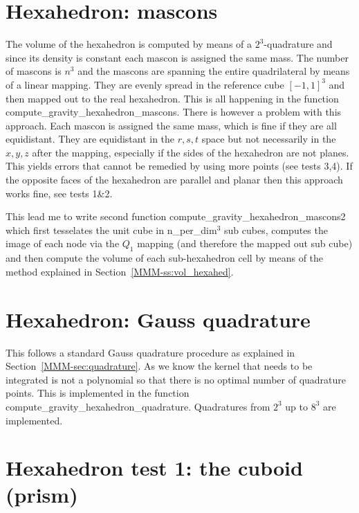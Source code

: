 \section*{Hexahedron: mascons}

The volume of the hexahedron is computed by means of a $2^3$-quadrature and since its density is 
constant each mascon is assigned the same mass. 
The number of mascons is $n^3$ and the mascons are spanning the entire 
quadrilateral by means of a linear mapping. They are evenly spread in the 
reference cube $[-1,1]^3$ and then mapped out to the real hexahedron.
This is all happening in the function {\python compute\_gravity\_hexahedron\_mascons}.
There is however a problem with this approach. Each mascon is assigned the same mass, 
which is fine if they are all equidistant. They are equidistant in the $r,s,t$ space
but not necessarily in the $x,y,z$ after the mapping, especially if the sides of the 
hexahedron are not planes. This yields errors that cannot be remedied by using 
more points (see tests 3,4). If the opposite faces of the hexahedron are  
parallel and planar then this approach works fine, see tests 1\&2.

This lead me to write second function {\python compute\_gravity\_hexahedron\_mascons2}
which first tesselates the unit cube in {\python n\_per\_dim}$^3$ sub cubes, 
computes the image of each node via the $Q_1$ mapping (and therefore the mapped out
sub cube) and then compute the volume of each sub-hexahedron cell by means of the method explained in 
Section~\ref{MMM-ss:vol_hexahed}.

\section*{Hexahedron: Gauss quadrature}

This follows a standard Gauss quadrature procedure as explained
in Section~\ref{MMM-sec:quadrature}. As we know the 
kernel that needs to be integrated is not a polynomial so that 
there is no optimal number of quadrature points. 
This is implemented in the function {\python compute\_gravity\_hexahedron\_quadrature}.
Quadratures from $2^3$ up to $8^3$ are implemented.

\section*{Hexahedron test 1: the cuboid (prism)}

